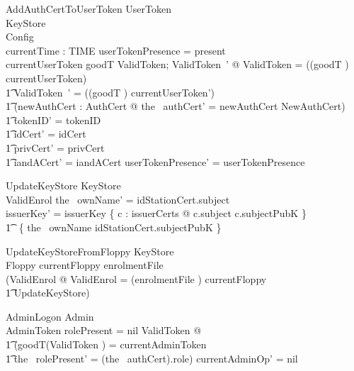 \begin{schema}{AddAuthCertToUserToken}
        \Delta UserToken
\\      KeyStore
\\      Config
\\      currentTime : TIME
\where
        userTokenPresence = present
\\      currentUserToken \in \ran goodT
\also
      \exists ValidToken; ValidToken~' @ \theta ValidToken = ((goodT \inv)
currentUserToken) 
\\ \t1  \land \theta ValidToken~' = ((goodT \inv) currentUserToken')
\\ \t1  \land (\exists newAuthCert : AuthCert @ the~ authCert' = newAuthCert
        \land NewAuthCert)
\\ \t1  \land tokenID' = tokenID
\\ \t1  \land idCert' = idCert
\\ \t1  \land privCert' = privCert
\\ \t1  \land iandACert' = iandACert
\also
        userTokenPresence' = userTokenPresence
\end{schema}

\begin{schema}{UpdateKeyStore}
        \Delta KeyStore
\\      ValidEnrol
\where
        the~ ownName' = idStationCert.subject
\\      issuerKey' = issuerKey \oplus\{ c : issuerCerts @ c.subject \mapsto c.subjectPubK
        \}
\\      \t1     \oplus ~\{ the~ ownName \mapsto idStationCert.subjectPubK \} 
\end{schema}

\begin{schema}{UpdateKeyStoreFromFloppy}
        \Delta KeyStore
\\      Floppy
\where
        currentFloppy \in \ran enrolmentFile
\\
        (\exists ValidEnrol @ \theta ValidEnrol = (enrolmentFile \inv)
currentFloppy
\\ \t1  \land UpdateKeyStore)   
\also
\end{schema}

\begin{schema}{AdminLogon}
        \Delta Admin
\\      AdminToken
\where
        rolePresent = nil
\also
        \exists ValidToken @
\\ \t1  (goodT(\theta ValidToken )  = currentAdminToken
\\ \t1  \land the~ rolePresent' = (the~ authCert).role)
\also
        currentAdminOp' = nil
\end{schema}

